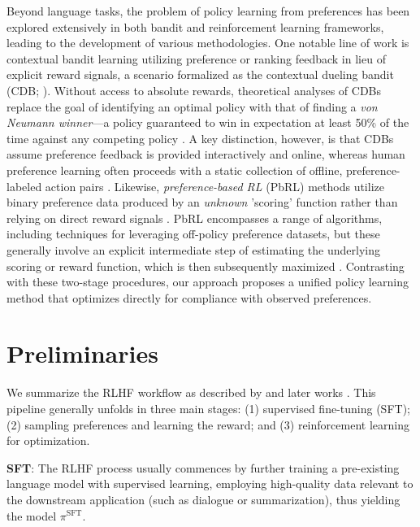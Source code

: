 Beyond language tasks, the problem of policy learning from preferences has been explored extensively in both bandit and reinforcement learning frameworks, leading to the development of various methodologies. One notable line of work is contextual bandit learning utilizing preference or ranking feedback in lieu of explicit reward signals, a scenario formalized as the contextual dueling bandit (CDB; \cite{yue2012karmed,dudik2015contextual}). Without access to absolute rewards, theoretical analyses of CDBs replace the goal of identifying an optimal policy with that of finding a \textit{von Neumann winner}—a policy guaranteed to win in expectation at least 50\% of the time against any competing policy \citep{dudik2015contextual}. A key distinction, however, is that CDBs assume preference feedback is provided interactively and online, whereas human preference learning often proceeds with a static collection of offline, preference-labeled action pairs \citep{yan2022human}. Likewise, \textit{preference-based RL} (PbRL) methods utilize binary preference data produced by an \textit{unknown} 'scoring' function rather than relying on direct reward signals \citep{BusaFekete2014,ruiz2023dueling}. PbRL encompasses a range of algorithms, including techniques for leveraging off-policy preference datasets, but these generally involve an explicit intermediate step of estimating the underlying scoring or reward function, which is then subsequently maximized \citep{jain2013learning,BusaFekete2014,christiano2017deep,sadigh2017active,kupcsik2018learning}. Contrasting with these two-stage procedures, our approach proposes a unified policy learning method that optimizes directly for compliance with observed preferences.

\section{Preliminaries}\label{section:prelims}

We summarize the RLHF workflow as described by \citeauthor{ziegler2020finetuning} and later works \citep{stiennon2022learning, bai2022training, ouyang2022training}. This pipeline generally unfolds in three main stages: (1) supervised fine-tuning (SFT); (2) sampling preferences and learning the reward; and (3) reinforcement learning for optimization.

\textbf{SFT}: The RLHF process usually commences by further training a pre-existing language model with supervised learning, employing high-quality data relevant to the downstream application (such as dialogue or summarization), thus yielding the model $\pi^\text{SFT}$.


